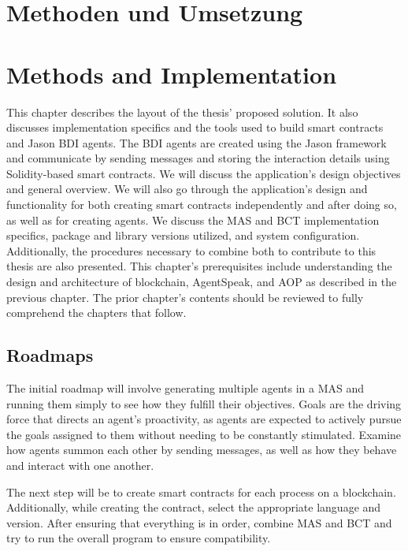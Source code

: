 {\chapter{Methoden und Umsetzung}}
{\chapter{Methods and Implementation}}
\label{sec:methods}


This chapter describes the layout of the thesis' proposed solution. It also discusses implementation specifics and the tools used to build smart contracts and Jason \ac{BDI} agents. The \ac{BDI} agents are created using the Jason framework and communicate by sending messages and storing the interaction details using Solidity-based smart contracts. We will discuss the application's design objectives and general overview. We will also go through the application's design and functionality for both creating smart contracts independently and after doing so, as well as for creating agents. We discuss the \ac{MAS} and \ac{BCT} implementation specifics, package and library versions utilized, and system configuration. Additionally, the procedures necessary to combine both to contribute to this thesis are also presented. This chapter's prerequisites include understanding the design and architecture of blockchain, AgentSpeak, and \ac{AOP} as described in the previous chapter. The prior chapter's contents should be reviewed to fully comprehend the chapters that follow.

\section{Roadmaps}

The initial roadmap will involve generating multiple agents in a \ac{MAS} and running them simply to see how they fulfill their objectives. Goals are the driving force that directs an agent's proactivity, as agents are expected to actively pursue the goals assigned to them without needing to be constantly stimulated. Examine how agents summon each other by sending messages, as well as how they behave and interact with one another. 

\vspace{.5cm}

The next step will be to create smart contracts for each process on a blockchain. Additionally, while creating the contract, select the appropriate language and version. After ensuring that everything is in order, combine \ac{MAS} and \ac{BCT} and try to run the overall program to ensure compatibility.

